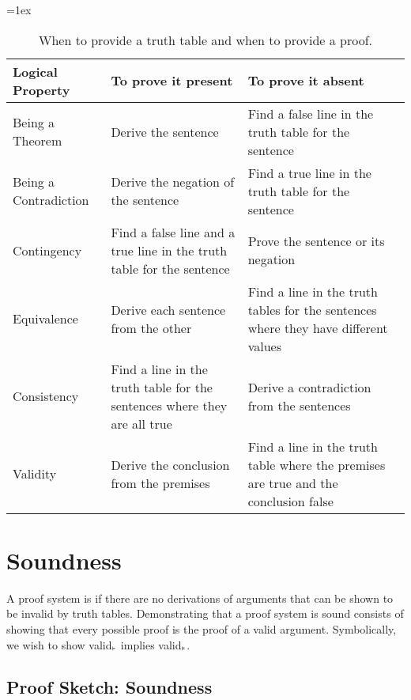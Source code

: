 \begin{table}[H]
\tabulinesep=1ex
\begin{tabu}{X[.5,c,m] ||X[1,l,m] |X[1,l,m]}
\textbf{Logical Property} 		&	\textbf{To prove it present} 	&	\textbf{To prove it absent} \\ \hline \hline

Being a Theorem   &	Derive the sentence & Find a false line in the truth table for the sentence	 \\ \hline
 
Being a Contradiction		&	Derive the negation of the sentence  & Find a true line in the truth table for the sentence \\ \hline

Contingency &	Find a false line and a true line in the truth table for the sentence & Prove the sentence or its negation \\ \hline

Equivalence &	Derive each sentence from the other & Find a line in the truth tables for the sentences where they have different values	\\ \hline

Consistency &	Find a line in the truth table for the sentences where they are all true	& Derive a contradiction from the sentences \\ \hline

Validity	&	Derive the conclusion from the premises & Find a line in the truth table where the premises are true and the conclusion false \\ 
\end{tabu}
\caption{When to provide a truth table and when to provide a proof.}
\label{table:prove_present_or_absent}
\end{table}



\section{ Soundness}

\begin{definition}
    A proof system is  if there are no derivations of arguments that can be shown to be invalid by truth tables. Demonstrating that a proof system is sound consists of showing that every possible proof is the proof of a valid argument. Symbolically, we wish to show valid$_{\vdash}$ implies valid$_{\vDash}$.
\end{definition}


\subsection{ Proof Sketch: Soundness}



